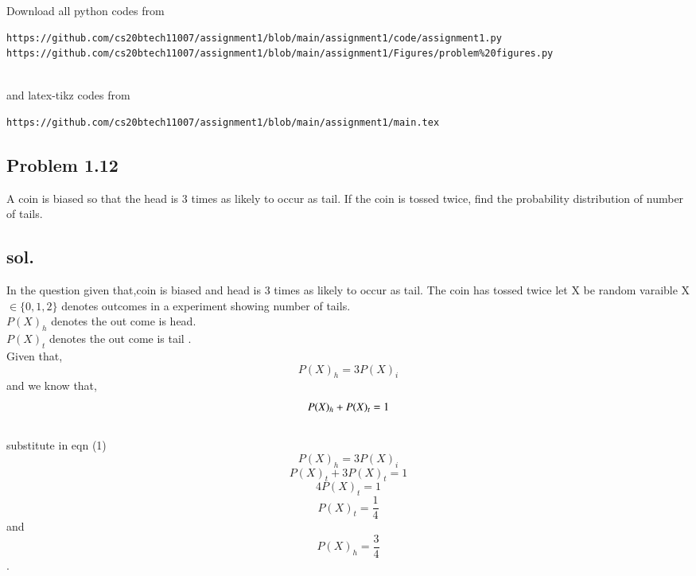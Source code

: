 \documentclass[journal,14pt,twocolumn]{IEEEtran}
\begin{document}
\maketitle
\newpage
\bigskip
\renewcommand{\thefigure}{\theenumi}
\renewcommand{\thetable}{\theenumi}
Download all python codes from 
\begin{lstlisting}
https://github.com/cs20btech11007/assignment1/blob/main/assignment1/code/assignment1.py
https://github.com/cs20btech11007/assignment1/blob/main/assignment1/Figures/problem%20figures.py


\end{lstlisting}
%
and latex-tikz codes from 
%
\begin{lstlisting}
https://github.com/cs20btech11007/assignment1/blob/main/assignment1/main.tex

\end{lstlisting}
\begin{center}
\section*{Problem 1.12}
\end{center}
A coin is biased so that the head is 3 times
as likely to occur as tail. If the coin is tossed
twice, find the probability distribution of
number of tails.\\

\subsection*{sol.}
 In the question given that,coin is biased and head is 3 times as likely to occur as tail.
The coin has tossed twice 
let X be random varaible X$\in\{0,1,2 \}$ denotes outcomes  in a experiment showing number of tails.\\
$P(X)_h$   denotes the out come is head.\\
$P(X)_t$    denotes the out come is tail .\\
Given that,$$P(X)_h=3P(X)_i$$
and we know that,
\begin{equation}
 P(X)_{h} +P(X)_{t}=1\\
\end{equation}\\

substitute in eqn (1)$$P(X)_h=3P(X)_i $$ 
$$P(X)_t+3P(X)_t=1$$
$$4P(X)_t=1$$
$$ P(X)_t=\frac{1}{4}$$
and $$P(X)_h=\frac{3}{4}$$.\\
\begin{table}[h]
\\
\caption{Outcome of the Experiment} 

\end{table}
\end{document}
